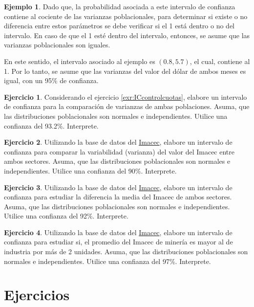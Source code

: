 \documentclass[
  11pt,
]{book}
\theoremstyle{definition}
\theoremstyle{definition}
\newtheorem{example}{Ejemplo}[chapter]
\theoremstyle{definition}
\newtheorem{exercise}{Ejercicio}[chapter]
\theoremstyle{definition}
\theoremstyle{remark}
\begin{document}
\begin{example}
Dado que, la probabilidad asociada a este intervalo de confianza contiene al cociente de las varianzas poblacionales, para determinar si existe o no diferencia entre estos parámetros se debe verificar si el 1 está dentro o no del intervalo. En caso de que el 1 esté dentro del intervalo, entonces, se asume que las varianzas poblacionales son iguales.

En este sentido, el intervalo asociado al ejemplo es \((0.8, 5.7)\), el cual, contiene al 1. Por lo tanto, se asume que las varianzas del valor del dólar de ambos meses es igual, con un 95\% de confianza.
\end{example}

\begin{exercise}
Considerando el ejercicio \ref{exr:ICcontrolcuotas}, elabore un intervalo de confianza para la comparación de varianzas de ambas poblaciones. Asuma, que las distribuciones poblacionales son normales e independientes. Utilice una confianza del 93.2\%. Interprete.
\end{exercise}

\begin{exercise}
Utilizando la base de datos del \hyperref[Imacec1]{Imacec}, elabore un intervalo de confianza para comparar la variabilidad (varianza) del valor del Imacec entre ambos sectores. Asuma, que las distribuciones poblacionales son normales e independientes. Utilice una confianza del 90\%. Interprete.
\end{exercise}

\begin{exercise}
Utilizando la base de datos del \hyperref[Imacec1]{Imacec}, elabore un intervalo de confianza para estudiar la diferencia la media del Imacec de ambos sectores. Asuma, que las distribuciones poblacionales son normales e independientes. Utilice una confianza del 92\%. Interprete.
\end{exercise}

\begin{exercise}
Utilizando la base de datos del \hyperref[Imacec1]{Imacec}, elabore un intervalo de confianza para estudiar si, el promedio del Imacec de minería es mayor al de industria por más de 2 unidades. Asuma, que las distribuciones poblacionales son normales e independientes. Utilice una confianza del 97\%. Interprete.
\end{exercise}

\section{Ejercicios}\label{ejercicios-unidad1}
\end{document}
